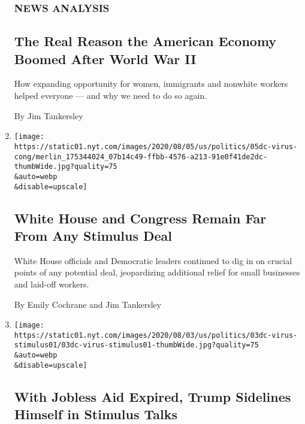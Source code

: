 \begin{enumerate}
  \hypertarget{news-analysis}{%
  \subsubsection{NEWS ANALYSIS}\label{news-analysis}}

  \hypertarget{the-real-reason-the-american-economy-boomed-after-world-war-ii}{%
  \subsection{The Real Reason the American Economy Boomed After World
  War
  II}\label{the-real-reason-the-american-economy-boomed-after-world-war-ii}}

  How expanding opportunity for women, immigrants and nonwhite workers
  helped everyone --- and why we need to do so again.

  By Jim Tankersley
\item
  \href{/2020/08/05/us/politics/congress-coronavirus-stimulus.html}{}

  \texttt{[image: https://static01.nyt.com/images/2020/08/05/us/politics/05dc-virus-cong/merlin\_175344024\_07b14c49-ffbb-4576-a213-91e0f41de2dc-thumbWide.jpg?quality=75\\\&auto=webp\\\&disable=upscale]}

  \hypertarget{white-house-and-congress-remain-far-from-any-stimulus-deal}{%
  \subsection{White House and Congress Remain Far From Any Stimulus
  Deal}\label{white-house-and-congress-remain-far-from-any-stimulus-deal}}

  White House officials and Democratic leaders continued to dig in on
  crucial points of any potential deal, jeopardizing additional relief
  for small businesses and laid-off workers.

  By Emily Cochrane and Jim Tankersley
\item
  \href{/2020/08/03/us/politics/congress-jobless-aid-talks-trump.html}{}

  \texttt{[image: https://static01.nyt.com/images/2020/08/03/us/politics/03dc-virus-stimulus01/03dc-virus-stimulus01-thumbWide.jpg?quality=75\\\&auto=webp\\\&disable=upscale]}

  \hypertarget{with-jobless-aid-expired-trump-sidelines-himself-in-stimulus-talks}{%
  \subsection{With Jobless Aid Expired, Trump Sidelines Himself in
  Stimulus
  Talks}\label{with-jobless-aid-expired-trump-sidelines-himself-in-stimulus-talks}}


\end{enumerate}
